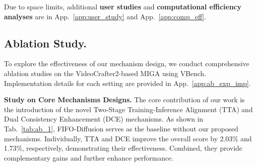 \documentclass{llmxive}
\begin{document}
Due to space limits, additional \textbf{user studies} and \textbf{computational efficiency analyses} are in App.~\ref{app:user_study} and App.~\ref{app:comp_eff}.





\subsection{Ablation Study.}
\label{sec:ablation}
To explore the effectiveness of our mechanism design, we conduct comprehensive ablation studies on the VideoCrafter2-based MIGA using VBench. Implementation details for each setting are provided in App.~\ref{app:ab_exp_imp}.




\textbf{Study on Core Mechanisms Designs.}
The core contribution of our work is the introduction of the novel Two-Stage Training-Inference Alignment (TTA) and Dual Consistency Enhancement (DCE) mechanisms. As shown in Tab.~\ref{tab:ab_1}, FIFO-Diffusion serves as the baseline without our proposed mechanisms. Individually, TTA and DCE improve the overall score by 2.03\% and 1.73\%, respectively, demonstrating their effectiveness. 
Combined, they provide complementary gains and further enhance performance.
\end{document}
